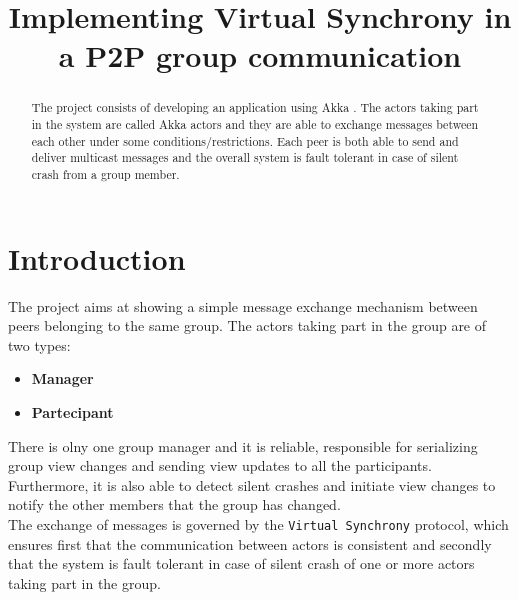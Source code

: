\documentclass[conference]{IEEEtran}
\begin{document}
\title{Implementing Virtual Synchrony in a P2P group communication}

\author{
}

\maketitle

\begin{abstract}
The project consists of developing an application using Akka \cite{Akka}. The actors
taking part in the system are called Akka actors and they are able
to exchange messages between each other under some conditions/restrictions.
Each peer is both able to send and deliver multicast messages and 
the overall system is fault tolerant in case of silent crash from
a group member.   

\end{abstract}

\section{Introduction}
\label{sec:introduction}
The project aims at showing a simple message exchange mechanism between
peers belonging to the same group. The actors taking part in the group
are of two types:
\begin{itemize}
	\item \textbf{Manager}
	\item \textbf{Partecipant}
\end{itemize} 
There is olny one group manager and it is reliable, responsible for serializing group view
changes and sending view updates to all the participants. 
Furthermore, it is also able to detect silent crashes and initiate view
changes to notify the other members that the group has changed.\\
The exchange of messages is governed by the \texttt{Virtual Synchrony}
protocol, which ensures first that the communication between actors is
consistent and secondly that the system is fault tolerant in case of
silent crash of one or more actors taking part in the group.
\end{document}

